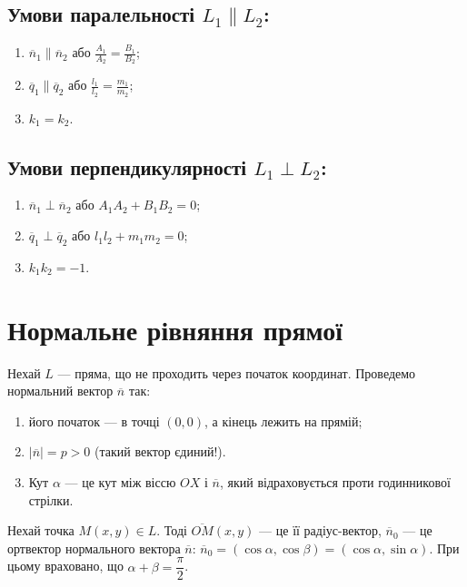\subsection*{Умови паралельності $L_1 \parallel L_2$:}

\begin{enumerate}
	\item $\overline{n}_1 \parallel \overline{n}_2$ або $\frac{A_1}{A_2} = \frac{B_1}{B_2}$;
	\item $\overline{q}_1 \parallel \overline{q}_2$ або $\frac{l_1}{l_2} = \frac{m_1}{m_2}$;
	\item $k_1 = k_2$.
\end{enumerate}

\subsection*{Умови перпендикулярності $L_1 \perp L_2$:}

\begin{enumerate}
	\item $\overline{n}_1 \perp \overline{n}_2$ або $A_1A_2 + B_1B_2 = 0$;
	\item $\overline{q}_1 \perp \overline{q}_2$ або $l_1l_2 + m_1m_2 = 0$;
	\item $k_1k_2 = -1$.
\end{enumerate}

\section{Нормальне рівняння прямої}

Нехай $L$ --- пряма, що не проходить через початок координат. Проведемо
нормальний вектор $\overline{n}$ так:
\begin{enumerate}
	\item його початок --- в точці $(0,0)$, а кінець лежить на прямій;
	\item $|\overline{n}| = p>0$ (такий вектор єдиний!).
	\item Кут $\alpha$ --- це кут між віссю $OX$ і $\overline{n}$, який відраховується проти годинникової стрілки.
\end{enumerate}

Нехай точка $M(x,y) \in L$. Тоді $\overline{OM}(x,y)$ --- це її радіус-вектор, $\overline{n}_0$ --- це ортвектор
нормального вектора $\overline{n}$: $\overline{n}_0 = (\cos\alpha,\cos\beta) = (\cos\alpha,\sin\alpha)$. При
цьому враховано, що $\alpha + \beta = \dfrac{\pi}{2}$.

